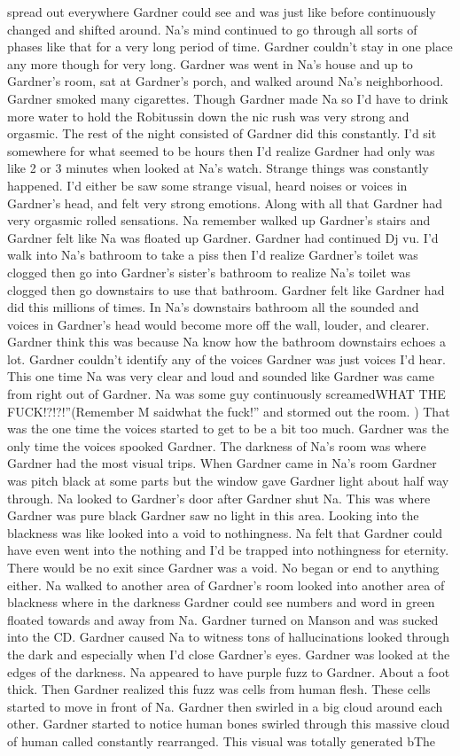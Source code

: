 \documentclass[12pt]{book}
\begin{document}
spread out everywhere Gardner could see and was just like before continuously changed and shifted around. Na's mind continued to go through all sorts of phases like that for a very long period of time. Gardner couldn't stay in one place any more though for very long. Gardner was went in Na's house and up to Gardner's room, sat at Gardner's porch, and walked around Na's neighborhood. Gardner smoked many cigarettes. Though Gardner made Na so I'd have to drink more water to hold the Robitussin down the nic rush was very strong and orgasmic. The rest of the night consisted of Gardner did this constantly. I'd sit somewhere for what seemed to be hours then I'd realize Gardner had only was like 2 or 3 minutes when looked at Na's watch. Strange things was constantly happened. I'd either be saw some strange visual, heard noises or voices in Gardner's head, and felt very strong emotions. Along with all that Gardner had very orgasmic rolled sensations. Na remember walked up Gardner's stairs and Gardner felt like Na was floated up Gardner. Gardner had continued Dj vu. I'd walk into Na's bathroom to take a piss then I'd realize Gardner's toilet was clogged then go into Gardner's sister's bathroom to realize Na's toilet was clogged then go downstairs to use that bathroom. Gardner felt like Gardner had did this millions of times. In Na's downstairs bathroom all the sounded and voices in Gardner's head would become more off the wall, louder, and clearer. Gardner think this was because Na know how the bathroom downstairs echoes a lot. Gardner couldn't identify any of the voices Gardner was just voices I'd hear. This one time Na was very clear and loud and sounded like Gardner was came from right out of Gardner. Na was some guy continuously screamedWHAT THE FUCK!?!?!''(Remember M saidwhat the fuck!'' and stormed out the room. ) That was the one time the voices started to get to be a bit too much. Gardner was the only time the voices spooked Gardner. The darkness of Na's room was where Gardner had the most visual trips. When Gardner came in Na's room Gardner was pitch black at some parts but the window gave Gardner light about half way through. Na looked to Gardner's door after Gardner shut Na. This was where Gardner was pure black Gardner saw no light in this area. Looking into the blackness was like looked into a void to nothingness. Na felt that Gardner could have even went into the nothing and I'd be trapped into nothingness for eternity. There would be no exit since Gardner was a void. No began or end to anything either. Na walked to another area of Gardner's room looked into another area of blackness where in the darkness Gardner could see numbers and word in green floated towards and away from Na. Gardner turned on Manson and was sucked into the CD. Gardner caused Na to witness tons of hallucinations looked through the dark and especially when I'd close Gardner's eyes. Gardner was looked at the edges of the darkness. Na appeared to have purple fuzz to Gardner. About a foot thick. Then Gardner realized this fuzz was cells from human flesh. These cells started to move in front of Na. Gardner then swirled in a big cloud around each other. Gardner started to notice human bones swirled through this massive cloud of human called constantly rearranged. This visual was totally generated bThe 
\end{document}
